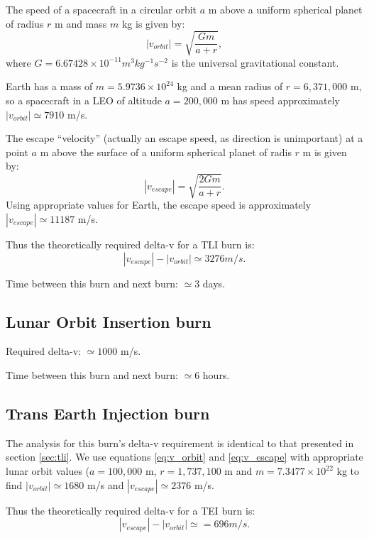 \documentclass{report}
\begin{document}
The speed of a spacecraft in a circular orbit $a$ m above a uniform spherical planet of radius $r$ m and mass $m$ kg is given by:
\begin{equation} \label{eq:v_orbit}
|v_{orbit}| = \sqrt{\frac{Gm}{a+r}},
\end{equation}
where $G = 6.67428 \times 10^{-11} m^3 kg^{-1} s^{-2}$ is the universal gravitational constant.

Earth has a mass of $m = 5.9736 \times 10^{24}$ kg and a mean radius of $r = 6,371,000$ m, so a spacecraft in a LEO of altitude $a = 200,000$ m has speed approximately $|v_{orbit}| \simeq 7910$ m/s.

The escape ``velocity'' (actually an escape speed, as direction is unimportant) at a point $a$ m above the surface of a uniform spherical planet of radis $r$ m is given by:
\begin{equation} \label{eq:v_escape}
|v_{escape}| = \sqrt{\frac{2Gm}{a+r}}.
\end{equation}
Using appropriate values for Earth, the escape speed is approximately $|v_{escape}| \simeq 11187$ m/s.

Thus the theoretically required delta-v for a TLI burn is:
\begin{equation}
|v_{escape}| - |v_{orbit}| \simeq 3276 m/s.
\end{equation}

Time between this burn and next burn: $\simeq 3$ days.

\subsection{Lunar Orbit Insertion burn}

Required delta-v: $\simeq 1000$ m/s.

Time between this burn and next burn: $\simeq 6$ hours.

\subsection{Trans Earth Injection burn}

The analysis for this burn's delta-v requirement is identical to that presented in section \ref{sec:tli}.  We use equations \ref{eq:v_orbit} and \ref{eq:v_escape} with appropriate lunar orbit values ($a = 100,000$ m, $r = 1,737,100$ m and $m = 7.3477 \times 10^{22}$ kg to find $|v_{orbit}| \simeq 1680$ m/s and $|v_{escape}| \simeq 2376$ m/s.

Thus the theoretically required delta-v for a TEI burn is:
\begin{equation}
|v_{escape}| - |v_{orbit}| \simeq = 696 m/s.
\end{equation}
\end{document}
